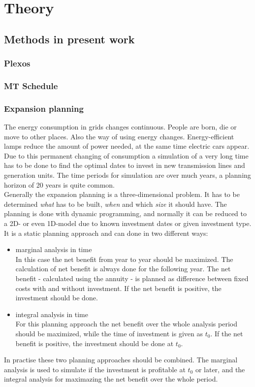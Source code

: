 \documentclass{article}
\begin{document}
\section{Theory}
\subsection{Methods in present work}
\subsubsection{Plexos}

\subsubsection{MT Schedule}
\subsubsection{Expansion planning}
The energy consumption in grids changes continuous. People are born, die or move to other places. Also the way of using energy changes. Energy-efficient lamps reduce the amount of power needed, at the same time electric cars appear. Due to this permanent changing of consumption a simulation of a very long time has to be done to find the optimal dates to invest in new transmission lines and generation units. The time periods for simulation are over much years, a planning horizon of 20 years is quite common.\\
Generally the expansion planning is a three-dimensional problem. It has to be determined \textit{what} has to be built, \textit{when} and which \textit{size} it should have. The planning is done with dynamic programming, and normally it can be reduced to a 2D- or even 1D-model due to known investment dates or given investment type. It is a static planning approach and can done in two different ways:
\begin{itemize}
\item marginal analysis in time\\
In this case the net benefit from year to year should be maximized. The calculation of net benefit is always done for the following year. The net benefit - calculated using the annuity - is planned as difference between fixed costs with and without investment. If the net benefit is positive, the investment should be done.
\item integral analysis in time\\
For this planning approach the net benefit over the whole analysis period should be maximized, while the time of investment is given as $t_0$. If the net benefit is positive, the investment should be done at $t_0$.
\end{itemize}
In practise these two planning approaches should be combined. The marginal analysis is used to simulate if the investment is profitable at $t_0$ or later, and the integral analysis for maximazing the net benefit over the whole period.
\end{document}
